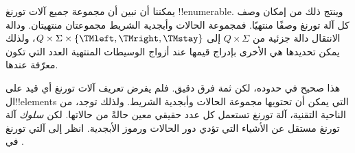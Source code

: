 \documentclass[../../../include/open-logic-section]{subfiles}
\begin{document}

\begin{explain}
يمكننا أن نبين أن مجموعة جميع آلات تورنغ !!{enumerable}. وينتج ذلك من
إمكان وصف كل آلة تورنغ وصفًا منتهيًا. فمجموعة الحالات وأبجدية الشريط
مجموعتان منتهيتان. ودالة الانتقال دالة جزئية من $Q \times \Sigma$ إلى
$Q \times \Sigma \times \{\TMleft,\TMright,\TMstay\}$، ولذلك يمكن
تحديدها هي الأخرى بإدراج قيمها عند أزواج الوسيطات المنتهية العدد التي
تكون معرّفة عندها.

هذا صحيح في حدوده، لكن ثمة فرق دقيق. فلم يفرض تعريف آلات تورنغ أي
قيد على ال!!{element}s التي يمكن أن تحتويها مجموعة الحالات وأبجدية
الشريط. ولذلك توجد، من الناحية التقنية، آلة تورنغ تستعمل كل عدد حقيقي
معين حالةً من حالاتها. لكن \emph{سلوك} آلة تورنغ مستقل عن الأشياء التي
تؤدي دور الحالات ورموز الأبجدية. انظر إلى آلتي تورنغ في
.
\begin{figure}
\begin{center}
\\
\end{center}
\end{figure}
\end{explain}
\end{document}
